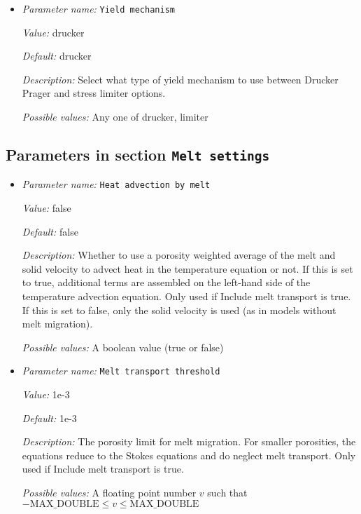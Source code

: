 \begin{itemize}
{\it Possible values:} A list of 0 to 4294967295 elements where each element is [A floating point number $v$ such that $0 \leq v \leq \text{MAX\_DOUBLE}$]
\item {\it Parameter name:} {\tt Yield mechanism}
\label{parameters:Material model/Visco Plastic/Yield mechanism}


{\it Value:} drucker


{\it Default:} drucker


{\it Description:} Select what type of yield mechanism to use between Drucker Prager and stress limiter options.


{\it Possible values:} Any one of drucker, limiter
\end{itemize}

\subsection{Parameters in section \tt Melt settings}
\label{parameters:Melt_20settings}

\begin{itemize}
\item {\it Parameter name:} {\tt Heat advection by melt}
\label{parameters:Melt settings/Heat advection by melt}


{\it Value:} false


{\it Default:} false


{\it Description:} Whether to use a porosity weighted average of the melt and solid velocity to advect heat in the temperature equation or not. If this is set to true, additional terms are assembled on the left-hand side of the temperature advection equation. Only used if Include melt transport is true. If this is set to false, only the solid velocity is used (as in models without melt migration).


{\it Possible values:} A boolean value (true or false)
\item {\it Parameter name:} {\tt Melt transport threshold}
\label{parameters:Melt settings/Melt transport threshold}


{\it Value:} 1e-3


{\it Default:} 1e-3


{\it Description:} The porosity limit for melt migration. For smaller porosities, the equations reduce to the Stokes equations and do neglect melt transport. Only used if Include melt transport is true. 


{\it Possible values:} A floating point number $v$ such that $-\text{MAX\_DOUBLE} \leq v \leq \text{MAX\_DOUBLE}$
\end{itemize}

